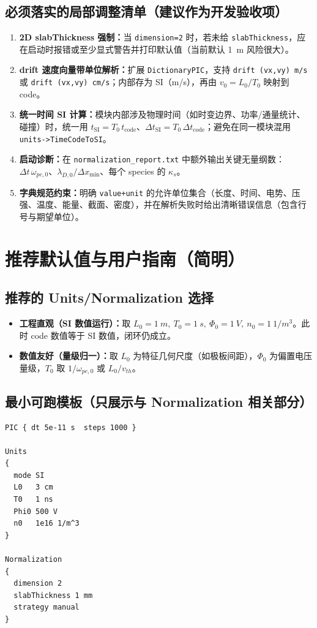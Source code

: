 \documentclass[11pt,a4paper]{ctexart}
\begin{document}
\subsection{必须落实的局部调整清单（建议作为开发验收项）}
\begin{enumerate}[leftmargin=2em]
  \item \textbf{2D slabThickness 强制：}当 \texttt{dimension=2} 时，若未给 \texttt{slabThickness}，应在启动时报错或至少显式警告并打印默认值（当前默认 \si{1 m} 风险很大）。
  \item \textbf{drift 速度向量带单位解析：}扩展 \texttt{DictionaryPIC}，支持
  \texttt{drift (vx,vy) m/s} 或 \texttt{drift (vx,vy) cm/s}；内部存为 SI（\si{m/s}），再由 $v_0=L_0/T_0$ 映射到 code。
  \item \textbf{统一时间 SI 计算：}模块内部涉及物理时间（如时变边界、功率/通量统计、碰撞）时，统一用
  $t_{\mathrm{SI}}=T_0\,t_{\mathrm{code}}$、$\Delta t_{\mathrm{SI}}=T_0\,\Delta t_{\mathrm{code}}$；避免在同一模块混用 \texttt{units->TimeCodeToSI}。
  \item \textbf{启动诊断：}在 \texttt{normalization\_report.txt} 中额外输出关键无量纲数：
  $\Delta t\,\omega_{pe,0}$、$\lambda_{D,0}/\Delta x_{\min}$、每个 species 的 $\kappa_s$。
  \item \textbf{字典规范约束：}明确 \texttt{value+unit} 的允许单位集合（长度、时间、电势、压强、温度、能量、截面、密度），并在解析失败时给出清晰错误信息（包含行号与期望单位）。
\end{enumerate}

\section{推荐默认值与用户指南（简明）}
\subsection{推荐的 Units/Normalization 选择}
\begin{itemize}[leftmargin=2em]
  \item \textbf{工程直观（SI 数值运行）：}取 $L_0=\SI{1}{m},\ T_0=\SI{1}{s},\ \Phi_0=\SI{1}{V},\ n_0=\SI{1}{1/m^3}$。此时 code 数值等于 SI 数值，闭环仍成立。
  \item \textbf{数值友好（量级归一）：}取 $L_0$ 为特征几何尺度（如极板间距），$\Phi_0$ 为偏置电压量级，$T_0$ 取 $1/\omega_{pe,0}$ 或 $L_0/v_{th}$。
\end{itemize}

\subsection{最小可跑模板（只展示与 Normalization 相关部分）}
\begin{lstlisting}
PIC { dt 5e-11 s  steps 1000 }

Units
{
  mode SI
  L0   3 cm
  T0   1 ns
  Phi0 500 V
  n0   1e16 1/m^3
}

Normalization
{
  dimension 2
  slabThickness 1 mm
  strategy manual
}
\end{lstlisting}
\end{document}
